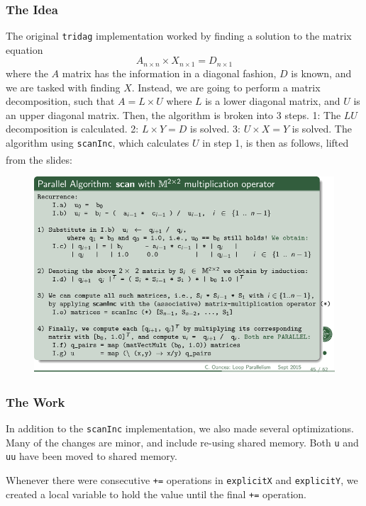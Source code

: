 \documentclass[12pt, oneside]{article}
\begin{document}
\subsubsection{The Idea}
The original \texttt{tridag} implementation worked by finding a solution to the matrix equation \[A_{n\times n}\times X_{n \times 1} = D_{n \times 1}\]
where the \(A\) matrix has the information in a diagonal fashion, \(D\) is known, and we are tasked with finding \(X\). Instead, we are going to perform a matrix decomposition, such that \(A = L \times U\) where \(L\) is a lower diagonal matrix, and \(U\) is an upper diagonal matrix. Then, the algorithm is broken into 3 steps. 1: The \(LU\) decomposition is calculated. 2: \(L \times Y = D\) is solved. 3: \(U \times X = Y\) is solved. The algorithm using \texttt{scanInc}, which calculates \(U\) in step 1, is then as follows, lifted from the slides\textsuperscript{\cite{l5slides}}:
\begin{figure}[h]
\includegraphics{images/parallelizing}
\end{figure}
\subsubsection{The Work}
In addition to the \texttt{scanInc} implementation, we also made several optimizations. Many of the changes are minor, and include re-using shared memory. Both \texttt{u} and \texttt{uu} have been moved to shared memory.

Whenever there were consecutive \texttt{+=} operations in \texttt{explicitX} and \texttt{explicitY}, we created a local variable to hold the value until the final \texttt{+=} operation.
\end{document}
